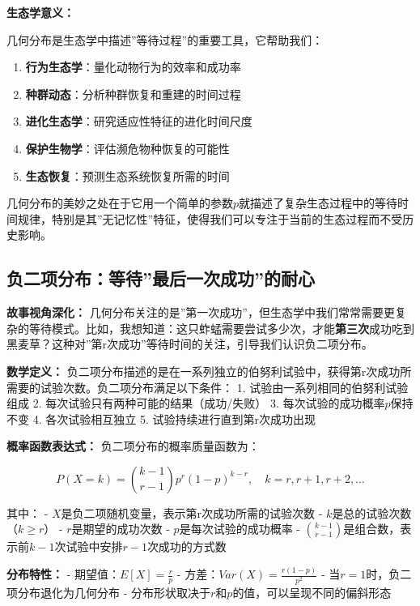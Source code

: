\documentclass[
]{book}
\providecommand{\tightlist}{%
  \setlength{\itemsep}{0pt}\setlength{\parskip}{0pt}}
\begin{document}
\textbf{生态学意义：}

几何分布是生态学中描述''等待过程''的重要工具，它帮助我们：

\begin{enumerate}
\def\labelenumi{\arabic{enumi}.}
\tightlist
\item
  \textbf{行为生态学}：量化动物行为的效率和成功率
\item
  \textbf{种群动态}：分析种群恢复和重建的时间过程
\item
  \textbf{进化生态学}：研究适应性特征的进化时间尺度
\item
  \textbf{保护生物学}：评估濒危物种恢复的可能性
\item
  \textbf{生态恢复}：预测生态系统恢复所需的时间
\end{enumerate}

几何分布的美妙之处在于它用一个简单的参数\(p\)就描述了复杂生态过程中的等待时间规律，特别是其''无记忆性''特征，使得我们可以专注于当前的生态过程而不受历史影响。

\hypertarget{ux8d1fux4e8cux9879ux5206ux5e03ux7b49ux5f85ux6700ux540eux4e00ux6b21ux6210ux529fux7684ux8010ux5fc3}{%
\subsection{负二项分布：等待''最后一次成功''的耐心}\label{ux8d1fux4e8cux9879ux5206ux5e03ux7b49ux5f85ux6700ux540eux4e00ux6b21ux6210ux529fux7684ux8010ux5fc3}}

\textbf{故事视角深化：} 几何分布关注的是''第一次成功''，但生态学中我们常常需要更复杂的等待模式。比如，我想知道：这只蚱蜢需要尝试多少次，才能\textbf{第三次}成功吃到黑麦草？这种对''第r次成功''等待时间的关注，引导我们认识负二项分布。

\textbf{数学定义：} 负二项分布描述的是在一系列独立的伯努利试验中，获得第r次成功所需要的试验次数。负二项分布满足以下条件：
1. 试验由一系列相同的伯努利试验组成
2. 每次试验只有两种可能的结果（成功/失败）
3. 每次试验的成功概率\(p\)保持不变
4. 各次试验相互独立
5. 试验持续进行直到第r次成功出现

\textbf{概率函数表达式：} 负二项分布的概率质量函数为：

\[P(X = k) = \binom{k-1}{r-1} p^r (1-p)^{k-r}, \quad k = r, r+1, r+2, \ldots\]

其中：
- \(X\)是负二项随机变量，表示第r次成功所需的试验次数
- \(k\)是总的试验次数（\(k \geq r\)）
- \(r\)是期望的成功次数
- \(p\)是每次试验的成功概率
- \(\binom{k-1}{r-1}\)是组合数，表示前\(k-1\)次试验中安排\(r-1\)次成功的方式数

\textbf{分布特性：}
- 期望值：\(E[X] = \frac{r}{p}\)
- 方差：\(Var(X) = \frac{r(1-p)}{p^2}\)
- 当\(r=1\)时，负二项分布退化为几何分布
- 分布形状取决于\(r\)和\(p\)的值，可以呈现不同的偏斜形态
\end{document}
